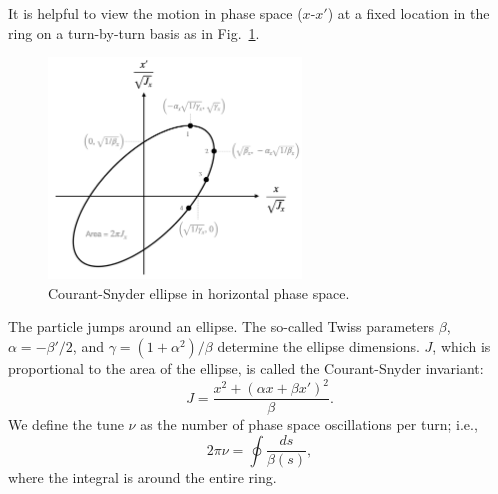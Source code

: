 It is helpful to view the motion in phase space ($x$-$x'$) at a fixed location in the ring on a turn-by-turn basis as in Fig.~\ref{fig:cs_ellipse}.
%
\begin{figure}
    \centering
    \includegraphics[width=0.6\textwidth]{Images/chapter1/cs_ellipse.png}
    \caption{Courant-Snyder ellipse in horizontal phase space.}
    \label{fig:cs_ellipse}
\end{figure}
%
The particle jumps around an ellipse. The so-called Twiss parameters $\beta$, $\alpha = -\beta' / 2$, and $\gamma = (1 + \alpha^2) / \beta$ determine the ellipse dimensions. $J$, which is proportional to the area of the ellipse, is called the Courant-Snyder invariant:
%
\begin{equation}\label{eq:CS invariant}
    J = \frac{x^2 + (\alpha x + \beta x')^2}{\beta}.
\end{equation}
%
We define the tune $\nu$ as the number of phase space oscillations per turn; i.e.,
%
\begin{equation}
    2\pi\nu = \oint{\frac{ds}{\beta(s)}},
\end{equation}
%
where the integral is around the entire ring.


